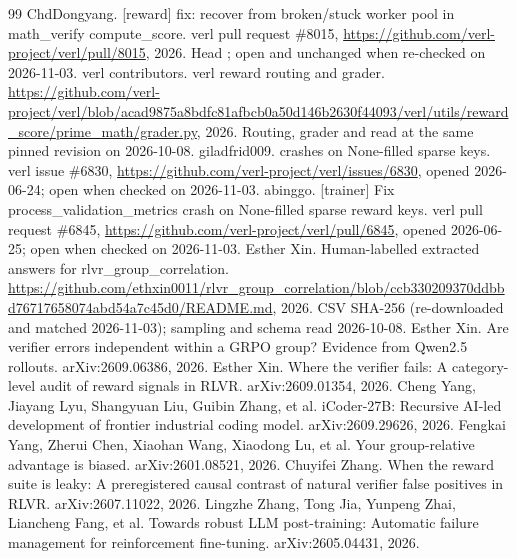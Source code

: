 \documentclass[11pt,a4paper]{article}
\begin{document}
\begin{thebibliography}{99}
 ChdDongyang. [reward] fix: recover from broken/stuck worker pool in math\_verify compute\_score. verl pull request \#8015, \url{https://github.com/verl-project/verl/pull/8015}, 2026. Head ; open and unchanged when re-checked on 2026-11-03.
 verl contributors. verl reward routing and  grader. \url{https://github.com/verl-project/verl/blob/acad9875a8bdfc81afbcb0a50d146b2630f44093/verl/utils/reward_score/prime_math/grader.py}, 2026. Routing, grader and  read at the same pinned revision on 2026-10-08.
 giladfrid009.  crashes on None-filled sparse  keys. verl issue \#6830, \url{https://github.com/verl-project/verl/issues/6830}, opened 2026-06-24; open when checked on 2026-11-03.
 abinggo. [trainer] Fix process\_validation\_metrics crash on None-filled sparse reward keys. verl pull request \#6845, \url{https://github.com/verl-project/verl/pull/6845}, opened 2026-06-25; open when checked on 2026-11-03.
 Esther Xin. Human-labelled extracted answers for rlvr\_group\_correlation. \url{https://github.com/ethxin0011/rlvr_group_correlation/blob/ccb330209370ddbbd76717658074abd54a7c45d0/README.md}, 2026. CSV SHA-256  (re-downloaded and matched 2026-11-03); sampling and schema read 2026-10-08.
 Esther Xin. Are verifier errors independent within a GRPO group? Evidence from Qwen2.5 rollouts. arXiv:2609.06386, 2026.
 Esther Xin. Where the verifier fails: A category-level audit of reward signals in RLVR. arXiv:2609.01354, 2026.
 Cheng Yang, Jiayang Lyu, Shangyuan Liu, Guibin Zhang, et al. iCoder-27B: Recursive AI-led development of frontier industrial coding model. arXiv:2609.29626, 2026.
 Fengkai Yang, Zherui Chen, Xiaohan Wang, Xiaodong Lu, et al. Your group-relative advantage is biased. arXiv:2601.08521, 2026.
 Chuyifei Zhang. When the reward suite is leaky: A preregistered causal contrast of natural verifier false positives in RLVR. arXiv:2607.11022, 2026.
 Lingzhe Zhang, Tong Jia, Yunpeng Zhai, Liancheng Fang, et al. Towards robust LLM post-training: Automatic failure management for reinforcement fine-tuning. arXiv:2605.04431, 2026.
\end{thebibliography}
\end{document}
